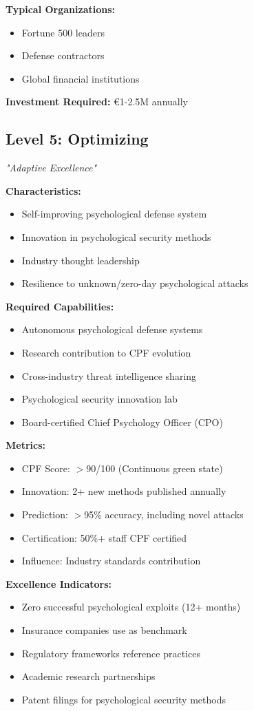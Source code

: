 \documentclass[11pt,a4paper]{article}
\begin{document}
\textbf{Typical Organizations:}
\begin{itemize}
\item Fortune 500 leaders
\item Defense contractors
\item Global financial institutions
\end{itemize}

\textbf{Investment Required:} €1-2.5M annually

\subsection{Level 5: Optimizing}
\textit{"Adaptive Excellence"}

\textbf{Characteristics:}
\begin{itemize}
\item Self-improving psychological defense system
\item Innovation in psychological security methods
\item Industry thought leadership
\item Resilience to unknown/zero-day psychological attacks
\end{itemize}

\textbf{Required Capabilities:}
\begin{itemize}
\item Autonomous psychological defense systems
\item Research contribution to CPF evolution
\item Cross-industry threat intelligence sharing
\item Psychological security innovation lab
\item Board-certified Chief Psychology Officer (CPO)
\end{itemize}

\textbf{Metrics:}
\begin{itemize}
\item CPF Score: $>$90/100 (Continuous green state)
\item Innovation: 2+ new methods published annually
\item Prediction: $>$95\% accuracy, including novel attacks
\item Certification: 50\%+ staff CPF certified
\item Influence: Industry standards contribution
\end{itemize}

\textbf{Excellence Indicators:}
\begin{itemize}
\item Zero successful psychological exploits (12+ months)
\item Insurance companies use as benchmark
\item Regulatory frameworks reference practices
\item Academic research partnerships
\item Patent filings for psychological security methods
\end{itemize}
\end{document}
